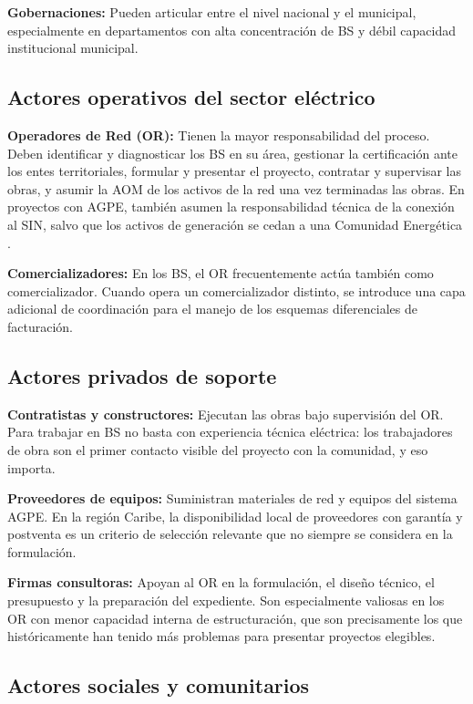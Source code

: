 \textbf{Gobernaciones:} Pueden articular entre el nivel nacional y el
municipal, especialmente en departamentos con alta concentración de BS
y débil capacidad institucional municipal.

\subsection{Actores operativos del sector eléctrico}
\label{subsec:actores_operativos}

\textbf{Operadores de Red (OR):} Tienen la mayor responsabilidad del
proceso. Deben identificar y diagnosticar los BS en su área, gestionar
la certificación ante los entes territoriales, formular y presentar
el proyecto, contratar y supervisar las obras, y asumir la AOM de los
activos de la red una vez terminadas las obras. En proyectos con AGPE,
también asumen la responsabilidad técnica de la conexión al SIN, salvo
que los activos de generación se cedan a una Comunidad Energética
\parencite{Decreto1023_2024}.

\textbf{Comercializadores:} En los BS, el OR frecuentemente actúa
también como comercializador. Cuando opera un comercializador distinto,
se introduce una capa adicional de coordinación para el manejo de los
esquemas diferenciales de facturación.

\subsection{Actores privados de soporte}
\label{subsec:actores_privados}

\textbf{Contratistas y constructores:} Ejecutan las obras bajo
supervisión del OR. Para trabajar en BS no basta con experiencia técnica
eléctrica: los trabajadores de obra son el primer contacto visible del
proyecto con la comunidad, y eso importa.

\textbf{Proveedores de equipos:} Suministran materiales de red y equipos
del sistema AGPE. En la región Caribe, la disponibilidad local de
proveedores con garantía y postventa es un criterio de selección
relevante que no siempre se considera en la formulación.

\textbf{Firmas consultoras:} Apoyan al OR en la formulación, el diseño
técnico, el presupuesto y la preparación del expediente. Son
especialmente valiosas en los OR con menor capacidad interna de
estructuración, que son precisamente los que históricamente han tenido
más problemas para presentar proyectos elegibles.

\subsection{Actores sociales y comunitarios}
\label{subsec:actores_comunitarios}

